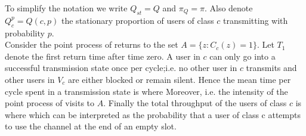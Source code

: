 \documentclass[letterpaper,english,10pt]{article}
\begin{document}
To simplify the notation we write $Q_{st} = Q$ and $\pi_Q = \pi$. Also denote $Q^p_c = Q({c, p})$ the stationary proportion of users of class $c$ transmitting with probability $p$.\\

Consider the point process of returns to the set $A = \{z : C_c(z) = 1\}$. Let $T_1$ denote the first return time after time zero. 
A user in $c$ can only go into a successful transmission state once per cycle;i.e. no other user in $c$ transmits and other users in $V_c$ are either blocked or remain silent. Hence the mean time per cycle spent in a transmission state is  where 
Moreover, i.e. the intensity of the point process of visits to $A$. Finally the total throughput of the users of class $c$ is  where
which can be interpreted as the probability that a user of class c attempts
to use the channel at the end of an empty slot.
\end{document}
